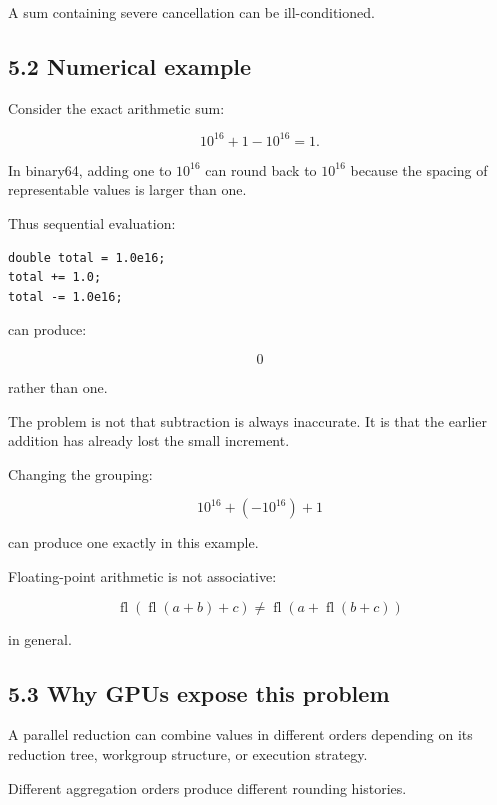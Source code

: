 A sum containing severe cancellation can be ill-conditioned.

\subsection{5.2 Numerical example}\label{02-foundations-ii-ch028-numerical-example}

\hypertarget{02-foundations-ii-ch028-numerical-example}{}

Consider the exact arithmetic sum:

\[ 10^{16}+1-10^{16}=1. \]

In binary64, adding one to \(10^{16}\) can round back to \(10^{16}\) because the spacing of representable values is larger than one.

Thus sequential evaluation:

\begin{verbatim}
double total = 1.0e16;
total += 1.0;
total -= 1.0e16;
\end{verbatim}

can produce:

\[ \boxed{0} \]

rather than one.

The problem is not that subtraction is always inaccurate. It is that the earlier addition has already lost the small increment.

Changing the grouping:

\[ 10^{16}+(-10^{16})+1 \]

can produce one exactly in this example.

Floating-point arithmetic is not associative:

\[ \boxed{ \operatorname{fl}(\operatorname{fl}(a+b)+c) \ne \operatorname{fl}(a+\operatorname{fl}(b+c)) } \]

in general.

\subsection{5.3 Why GPUs expose this problem}\label{02-foundations-ii-ch028-why-gpus-expose-this-problem}

\hypertarget{02-foundations-ii-ch028-why-gpus-expose-this-problem}{}

A parallel reduction can combine values in different orders depending on its reduction tree, workgroup structure, or execution strategy.

Different aggregation orders produce different rounding histories.

